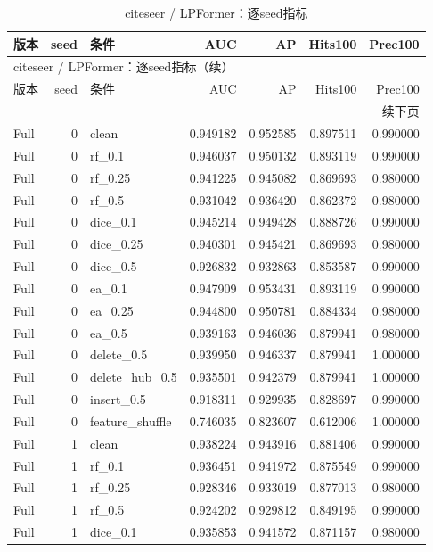 \documentclass[UTF8,a4paper,11pt,fontset=fandol]{ctexart}
\begin{document}
{\footnotesize
\setlength{\tabcolsep}{3pt}
\begin{longtable}{lrlrrrr}
\caption{citeseer / LPFormer：逐seed指标}\\
\toprule
版本 & seed & 条件 & AUC & AP & Hits100 & Prec100 \\
\midrule
\endfirsthead
\multicolumn{7}{l}{citeseer / LPFormer：逐seed指标（续）}\\
\toprule
版本 & seed & 条件 & AUC & AP & Hits100 & Prec100 \\
\midrule
\endhead
\midrule\multicolumn{7}{r}{续下页}\\
\endfoot
\bottomrule\endlastfoot
Full & 0 & clean & 0.949182 & 0.952585 & 0.897511 & 0.990000 \\
Full & 0 & rf\_0.1 & 0.946037 & 0.950132 & 0.893119 & 0.990000 \\
Full & 0 & rf\_0.25 & 0.941225 & 0.945082 & 0.869693 & 0.980000 \\
Full & 0 & rf\_0.5 & 0.931042 & 0.936420 & 0.862372 & 0.980000 \\
Full & 0 & dice\_0.1 & 0.945214 & 0.949428 & 0.888726 & 0.990000 \\
Full & 0 & dice\_0.25 & 0.940301 & 0.945421 & 0.869693 & 0.980000 \\
Full & 0 & dice\_0.5 & 0.926832 & 0.932863 & 0.853587 & 0.990000 \\
Full & 0 & ea\_0.1 & 0.947909 & 0.953431 & 0.893119 & 0.990000 \\
Full & 0 & ea\_0.25 & 0.944800 & 0.950781 & 0.884334 & 0.980000 \\
Full & 0 & ea\_0.5 & 0.939163 & 0.946036 & 0.879941 & 0.980000 \\
Full & 0 & delete\_0.5 & 0.939950 & 0.946337 & 0.879941 & 1.000000 \\
Full & 0 & delete\_hub\_0.5 & 0.935501 & 0.942379 & 0.879941 & 1.000000 \\
Full & 0 & insert\_0.5 & 0.918311 & 0.929935 & 0.828697 & 0.990000 \\
Full & 0 & feature\_shuffle & 0.746035 & 0.823607 & 0.612006 & 1.000000 \\
Full & 1 & clean & 0.938224 & 0.943916 & 0.881406 & 0.990000 \\
Full & 1 & rf\_0.1 & 0.936451 & 0.941972 & 0.875549 & 0.990000 \\
Full & 1 & rf\_0.25 & 0.928346 & 0.933019 & 0.877013 & 0.980000 \\
Full & 1 & rf\_0.5 & 0.924202 & 0.929812 & 0.849195 & 0.990000 \\
Full & 1 & dice\_0.1 & 0.935853 & 0.941572 & 0.871157 & 0.980000 \\

\end{longtable}}
\end{document}
